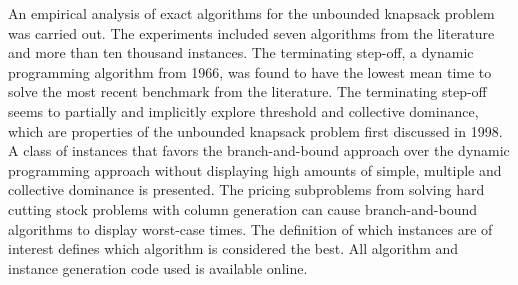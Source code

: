 An empirical analysis of exact algorithms for the unbounded knapsack problem was carried out.
The experiments included seven algorithms from the literature and more than ten thousand instances.
The terminating step-off, a dynamic programming algorithm from 1966, was found to have the lowest mean time to solve the most recent benchmark from the literature.
The terminating step-off seems to partially and implicitly explore threshold and collective dominance, which are properties of the unbounded knapsack problem first discussed in 1998.
A class of instances that favors the branch-and-bound approach over the dynamic programming approach without displaying high amounts of simple, multiple and collective dominance is presented.
The pricing subproblems from solving hard cutting stock problems with column generation can cause branch-and-bound algorithms to display worst-case times. %
The definition of which instances are of interest defines which algorithm is considered the best.
All algorithm and instance generation code used is available online.

